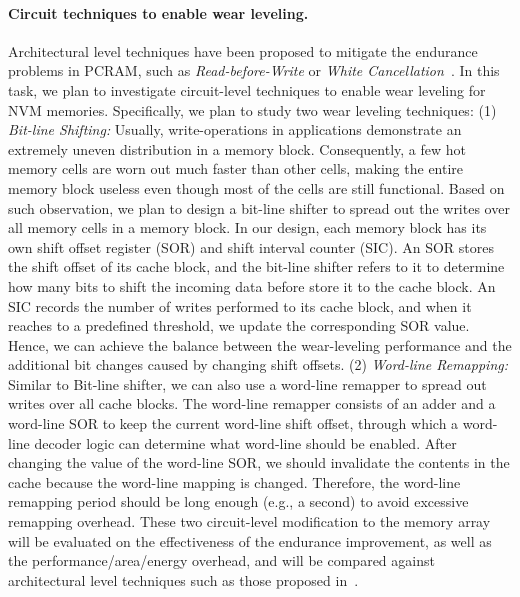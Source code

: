 \paragraph{Circuit techniques to enable wear leveling.} Architectural level techniques have been proposed to mitigate the endurance problems in PCRAM, such as \textit{Read-before-Write} or \textit{White Cancellation}~\cite{Lee09,PRAM:IBM}. In this task, we plan to investigate circuit-level techniques to enable wear leveling for NVM memories. Specifically, we plan to study two wear leveling techniques: (1) \textit{Bit-line Shifting:} Usually, write-operations in applications demonstrate an extremely uneven distribution in a memory block. Consequently, a few hot memory cells are worn out much faster than other cells, making the entire memory block useless even though most of the cells are still functional. Based on such observation, we plan to design a bit-line shifter to spread out the writes over all memory cells in a memory block. In our design, each memory block has its own shift offset register (SOR) and shift interval counter (SIC). An SOR stores the shift offset of its cache block, and the bit-line shifter refers to it to determine how many bits to shift the incoming data before store it to the cache block. An SIC records the number of writes performed to its cache block, and when it reaches to a predefined threshold, we update the corresponding SOR value. Hence, we can achieve the balance between the wear-leveling performance and the additional bit changes caused by changing shift offsets. (2) \textit{Word-line Remapping:} Similar to Bit-line shifter, we can also use a word-line remapper to spread out writes over all cache blocks. The word-line remapper consists of an adder and a word-line SOR to keep the current word-line shift offset, through which a word-line decoder logic can determine what word-line should be enabled. After changing the value of the word-line SOR, we should invalidate the contents in the cache because the word-line mapping is changed. Therefore, the word-line remapping period should be long enough (e.g., a second) to avoid excessive remapping overhead. These two circuit-level modification to the memory array will be evaluated on the effectiveness of the endurance improvement, as well as the performance/area/energy overhead, and will be compared against architectural level techniques such as those proposed in~\cite{Lee09,PRAM:IBM}.

